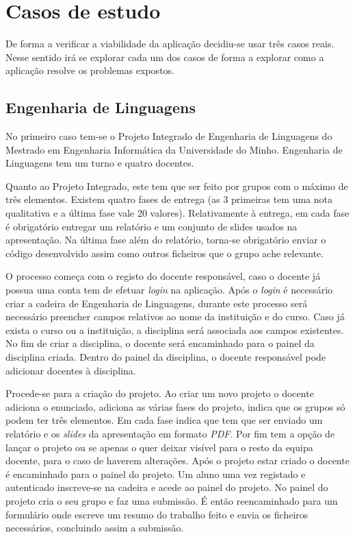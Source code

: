 \section{Casos de estudo}
De forma a verificar a viabilidade da aplicação decidiu-se usar três casos reais. Nesse sentido irá se explorar cada um dos casos de forma a explorar como a aplicação resolve os problemas expostos.

\subsection{Engenharia de Linguagens} %
\label{sub:engenharia_de_linguagens}


No primeiro caso tem-se o Projeto Integrado de Engenharia de Linguagens do Mestrado em Engenharia Informática da Universidade do Minho.
Engenharia de Linguagens tem um turno e quatro docentes.

Quanto ao Projeto Integrado, este tem que ser feito por grupos com o máximo de três elementos. Existem quatro fases de entrega (as 3 primeiras tem uma nota qualitativa e a última fase vale 20 valores). Relativamente à entrega, em cada fase é obrigatório entregar um relatório e um conjunto de slides usados na apresentação. Na última fase além do relatório, torna-se obrigatório enviar o código desenvolvido assim como outros ficheiros que o grupo ache relevante.

O processo começa com o registo do docente responsável, caso o docente já possua uma conta tem de efetuar \emph{login} na aplicação. Após o \emph{login} é necessário criar a cadeira de Engenharia de Linguagens, durante este processo será necessário preencher campos relativos ao nome da instituição e do curso. Caso já  exista o curso ou a instituição, a disciplina será associada aos campos existentes. No fim de criar a disciplina, o docente será encaminhado para o painel da disciplina criada. Dentro do painel da disciplina, o docente responsável pode adicionar docentes à disciplina.

Procede-se para a criação do projeto. Ao criar um novo projeto o docente adiciona o enunciado, adiciona as várias fases do projeto, indica que os grupos só podem ter três elementos. Em cada fase indica que tem que ser enviado um relatório e os \emph{slides} da apresentação em formato \emph{PDF}. Por fim tem a opção de lançar o projeto ou se apenas o quer deixar visível para o resto da equipa docente, para o caso de haverem alterações. Após o projeto estar criado o docente é encaminhado para o painel do projeto.
Um aluno uma vez registado e autenticado inscreve-se na cadeira e acede ao painel do projeto. No painel do projeto cria o seu grupo e faz uma submissão. É então reencaminhado para um formulário onde escreve um resumo do trabalho feito e envia os ficheiros necessários, concluindo assim a submissão.

